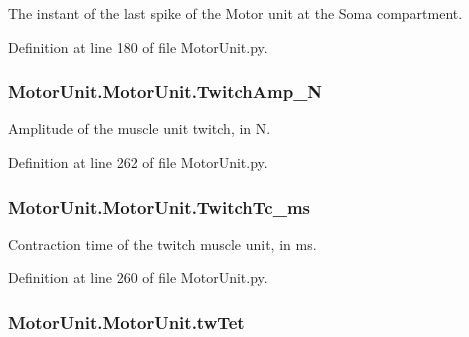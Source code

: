 The instant of the last spike of the Motor unit at the Soma compartment. 



Definition at line 180 of file Motor\+Unit.\+py.

\subsubsection[{\texorpdfstring{Twitch\+Amp\+\_\+N}{TwitchAmp_N}}]{\setlength{\rightskip}{0pt plus 5cm}Motor\+Unit.\+Motor\+Unit.\+Twitch\+Amp\+\_\+N}\hypertarget{class_motor_unit_1_1_motor_unit_ad14af870eb3dd7468041853f2c6e8cab}{}\label{class_motor_unit_1_1_motor_unit_ad14af870eb3dd7468041853f2c6e8cab}


Amplitude of the muscle unit twitch, in N. 



Definition at line 262 of file Motor\+Unit.\+py.

\subsubsection[{\texorpdfstring{Twitch\+Tc\+\_\+ms}{TwitchTc_ms}}]{\setlength{\rightskip}{0pt plus 5cm}Motor\+Unit.\+Motor\+Unit.\+Twitch\+Tc\+\_\+ms}\hypertarget{class_motor_unit_1_1_motor_unit_a083581c89ebb964e58721667307dd2bc}{}\label{class_motor_unit_1_1_motor_unit_a083581c89ebb964e58721667307dd2bc}


Contraction time of the twitch muscle unit, in ms. 



Definition at line 260 of file Motor\+Unit.\+py.

\subsubsection[{\texorpdfstring{tw\+Tet}{twTet}}]{\setlength{\rightskip}{0pt plus 5cm}Motor\+Unit.\+Motor\+Unit.\+tw\+Tet}\hypertarget{class_motor_unit_1_1_motor_unit_a2a466c5f2f798901c1c438f9d57c2221}{}\label{class_motor_unit_1_1_motor_unit_a2a466c5f2f798901c1c438f9d57c2221}


